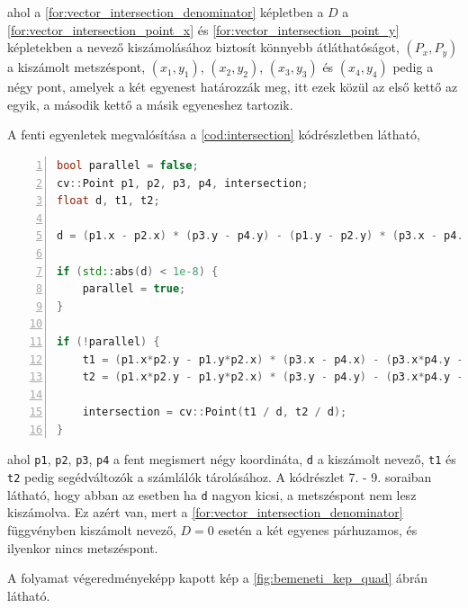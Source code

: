 \par ahol a \ref{for:vector_intersection_denominator} képletben a $D$ a \ref{for:vector_intersection_point_x} és \ref{for:vector_intersection_point_y} képletekben a nevező kiszámolásához biztosít könnyebb átláthatóságot, $(P_x, P_y)$ a kiszámolt metszéspont, $(x_1, y_1)$, $(x_2, y_2)$, $(x_3, y_3)$ és $(x_4, y_4)$ pedig a négy pont, amelyek a két egyenest határozzák meg, itt ezek közül az első kettő az egyik, a második kettő a másik egyeneshez tartozik.
\par A fenti egyenletek megvalósítása a \ref{cod:intersection} kódrészletben látható,

\vspace{2mm}
\hspace{-10mm}
\begin{minipage}{\linewidth}
\begin{lstlisting}[language=C++, numbers=left, caption={Metszéspont kereső algoritmus.}, label={cod:intersection}]
bool parallel = false;
cv::Point p1, p2, p3, p4, intersection;
float d, t1, t2;

d = (p1.x - p2.x) * (p3.y - p4.y) - (p1.y - p2.y) * (p3.x - p4.x);

if (std::abs(d) < 1e-8) {
    parallel = true;
}

if (!parallel) {
    t1 = (p1.x*p2.y - p1.y*p2.x) * (p3.x - p4.x) - (p3.x*p4.y - p3.y*p4.x) * (p1.x - p2.x);
    t2 = (p1.x*p2.y - p1.y*p2.x) * (p3.y - p4.y) - (p3.x*p4.y - p3.y*p4.x) * (p1.y - p2.y);
    
    intersection = cv::Point(t1 / d, t2 / d);
}
\end{lstlisting}
\end{minipage}

\par ahol \lstinline{p1}, \lstinline{p2}, \lstinline{p3}, \lstinline{p4} a fent megismert négy koordináta, \lstinline{d} a kiszámolt nevező, \lstinline{t1} és \lstinline{t2} pedig segédváltozók a számlálók tárolásához. A kódrészlet 7. - 9. soraiban látható, hogy abban az esetben ha \lstinline{d} nagyon kicsi, a metszéspont nem lesz kiszámolva. Ez azért van, mert a \ref{for:vector_intersection_denominator} függvényben kiszámolt nevező, $D = 0$ esetén a két egyenes párhuzamos, és ilyenkor nincs metszéspont.
\par A folyamat végeredményeképp kapott kép a \ref{fig:bemeneti_kep_quad} ábrán látható.

